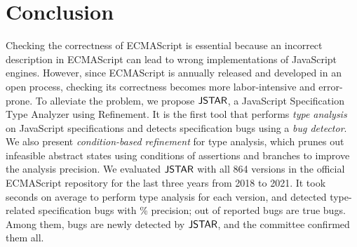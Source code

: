 \section{Conclusion}\label{sec:conclusion}
Checking the correctness of ECMAScript is essential because an incorrect description
in ECMAScript can lead to wrong implementations of JavaScript engines. However,
since ECMAScript is annually released and developed in an open process, checking
its correctness becomes more labor-intensive and error-prone.  To alleviate the problem,
we propose $\tool$, a JavaScript Specification Type Analyzer using Refinement.
It is the first tool that performs \textit{type analysis} on JavaScript specifications and
detects specification bugs using a \textit{bug detector}.  We also present
\textit{condition-based refinement} for type analysis, which prunes out infeasible abstract states
using conditions of assertions and branches to improve the analysis precision.
We evaluated $\tool$ with all 864 versions in the official ECMAScript repository
for the last three years from 2018 to 2021.  It took  seconds on average
to perform type analysis for each version, and detected  type-related specification bugs with
\% precision;  out of  reported bugs are true bugs.
Among them,  bugs are newly detected by $\tool$, and the
committee confirmed them all.
